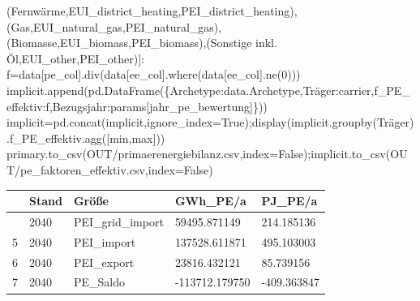 \documentclass[
  ngerman,
  a4paper,
  DIV=11]{scrreprt}
\newenvironment{Shaded}{\begin{snugshade}}{\end{snugshade}}
\newcommand{\DecValTok}[1]{\textcolor[rgb]{0.68,0.00,0.00}{#1}}
\newcommand{\NormalTok}[1]{\textcolor[rgb]{0.00,0.23,0.31}{#1}}
\newcommand{\OperatorTok}[1]{\textcolor[rgb]{0.37,0.37,0.37}{#1}}
\newcommand{\StringTok}[1]{\textcolor[rgb]{0.13,0.47,0.30}{#1}}
\newcommand{\VariableTok}[1]{\textcolor[rgb]{0.07,0.07,0.07}{#1}}
\newcounter{none} %
\begin{document}
\begin{Shaded}
\begin{Highlighting}[]
\NormalTok{ (}\StringTok{\textquotesingle{}Fernwärme\textquotesingle{}}\NormalTok{,}\StringTok{\textquotesingle{}EUI\_district\_heating\textquotesingle{}}\NormalTok{,}\StringTok{\textquotesingle{}PEI\_district\_heating\textquotesingle{}}\NormalTok{),(}\StringTok{\textquotesingle{}Gas\textquotesingle{}}\NormalTok{,}\StringTok{\textquotesingle{}EUI\_natural\_gas\textquotesingle{}}\NormalTok{,}\StringTok{\textquotesingle{}PEI\_natural\_gas\textquotesingle{}}\NormalTok{),}
\NormalTok{ (}\StringTok{\textquotesingle{}Biomasse\textquotesingle{}}\NormalTok{,}\StringTok{\textquotesingle{}EUI\_biomass\textquotesingle{}}\NormalTok{,}\StringTok{\textquotesingle{}PEI\_biomass\textquotesingle{}}\NormalTok{),(}\StringTok{\textquotesingle{}Sonstige inkl. Öl\textquotesingle{}}\NormalTok{,}\StringTok{\textquotesingle{}EUI\_other\textquotesingle{}}\NormalTok{,}\StringTok{\textquotesingle{}PEI\_other\textquotesingle{}}\NormalTok{)]:}
\NormalTok{    f}\OperatorTok{=}\NormalTok{data[pe\_col].div(data[ee\_col].where(data[ee\_col].ne(}\DecValTok{0}\NormalTok{)))}
\NormalTok{    implicit.append(pd.DataFrame(\{}\StringTok{\textquotesingle{}Archetype\textquotesingle{}}\NormalTok{:data.Archetype,}\StringTok{\textquotesingle{}Träger\textquotesingle{}}\NormalTok{:carrier,}\StringTok{\textquotesingle{}f\_PE\_effektiv\textquotesingle{}}\NormalTok{:f,}\StringTok{\textquotesingle{}Bezugsjahr\textquotesingle{}}\NormalTok{:params[}\StringTok{\textquotesingle{}jahr\_pe\_bewertung\textquotesingle{}}\NormalTok{]\}))}
\NormalTok{implicit}\OperatorTok{=}\NormalTok{pd.concat(implicit,ignore\_index}\OperatorTok{=}\VariableTok{True}\NormalTok{)}\OperatorTok{;}\NormalTok{display(implicit.groupby(}\StringTok{\textquotesingle{}Träger\textquotesingle{}}\NormalTok{).f\_PE\_effektiv.agg([}\StringTok{\textquotesingle{}min\textquotesingle{}}\NormalTok{,}\StringTok{\textquotesingle{}max\textquotesingle{}}\NormalTok{]))}
\NormalTok{primary.to\_csv(OUT}\OperatorTok{/}\StringTok{\textquotesingle{}primaerenergiebilanz.csv\textquotesingle{}}\NormalTok{,index}\OperatorTok{=}\VariableTok{False}\NormalTok{)}\OperatorTok{;}\NormalTok{implicit.to\_csv(OUT}\OperatorTok{/}\StringTok{\textquotesingle{}pe\_faktoren\_effektiv.csv\textquotesingle{}}\NormalTok{,index}\OperatorTok{=}\VariableTok{False}\NormalTok{)}
\end{Highlighting}
\end{Shaded}

{\def\LTcaptype{none} %
\begin{longtable}[]{@{}lllll@{}}
\toprule\noalign{}
& Stand & Größe & GWh\_PE/a & PJ\_PE/a \\
\midrule\noalign{}
\endhead
\bottomrule\noalign{}
\endlastfoot
4 & 2040 & PEI\_grid\_import & 59495.871149 & 214.185136 \\
5 & 2040 & PEI\_import & 137528.611871 & 495.103003 \\
6 & 2040 & PEI\_export & 23816.432121 & 85.739156 \\
7 & 2040 & PE\_Saldo & -113712.179750 & -409.363847 \\
\end{longtable}
}
\end{document}
